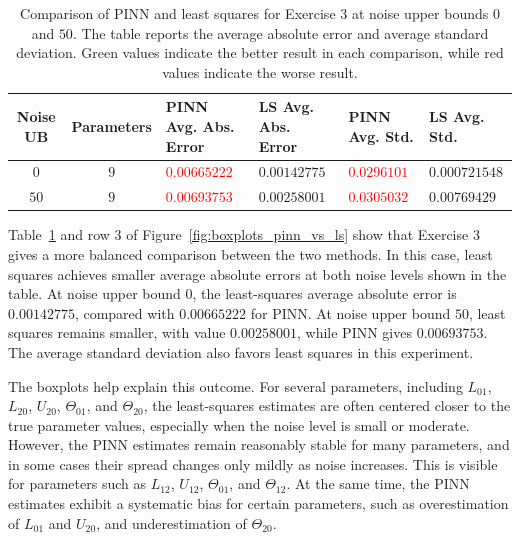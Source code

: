 \documentclass[11pt]{article}
\begin{document}
\begin{table}[H]
\centering
\scriptsize
\renewcommand{\arraystretch}{1.25}
\setlength{\tabcolsep}{3pt}
\begin{tabularx}{\textwidth}{|c|c|
>{\centering\arraybackslash}X|
>{\centering\arraybackslash}X|
>{\centering\arraybackslash}X|
>{\centering\arraybackslash}X|}
\hline
\textbf{Noise UB} &
\textbf{Parameters} &
\textbf{PINN Avg. Abs. Error} &
\textbf{LS Avg. Abs. Error} &
\textbf{PINN Avg. Std.} &
\textbf{LS Avg. Std.} \\
\hline

\(0\) & \(9\)
& \textcolor{red}{\(0.00665222\)}
& \textcolor{green!50!black}{\(0.00142775\)}
& \textcolor{red}{\(0.0296101\)}
& \textcolor{green!50!black}{\(0.000721548\)} \\
\hline

\(50\) & \(9\)
& \textcolor{red}{\(0.00693753\)}
& \textcolor{green!50!black}{\(0.00258001\)}
& \textcolor{red}{\(0.0305032\)}
& \textcolor{green!50!black}{\(0.00769429\)} \\
\hline

\end{tabularx}
\caption{Comparison of PINN and least squares for Exercise 3 at noise upper bounds \(0\) and \(50\). The table reports the average absolute error and average standard deviation. Green values indicate the better result in each comparison, while red values indicate the worse result.}
\label{tab:ex3-error-std-comparison}
\end{table}

 Table~\ref{tab:ex3-error-std-comparison} and row 3 of Figure~\ref{fig:boxplots_pinn_vs_ls} show that Exercise 3 gives a more balanced comparison between the two methods. In this case, least squares achieves smaller average absolute errors at both noise levels shown in the table. At noise upper bound \(0\), the least-squares average absolute error is \(0.00142775\), compared with \(0.00665222\) for PINN. At noise upper bound \(50\), least squares remains smaller, with value \(0.00258001\), while PINN gives \(0.00693753\). The average standard deviation also favors least squares in this experiment.

The boxplots help explain this outcome. For several parameters, including \(L_{01}\), \(L_{20}\), \(U_{20}\), \(\Theta_{01}\), and \(\Theta_{20}\), the least-squares estimates are often centered closer to the true parameter values, especially when the noise level is small or moderate. However, the PINN estimates remain reasonably stable for many parameters, and in some cases their spread changes only mildly as noise increases. This is visible for parameters such as \(L_{12}\), \(U_{12}\), \(\Theta_{01}\), and \(\Theta_{12}\). At the same time, the PINN estimates exhibit a systematic bias for certain parameters, such as overestimation of \(L_{01}\) and \(U_{20}\), and underestimation of \(\Theta_{20}\).
\end{document}
